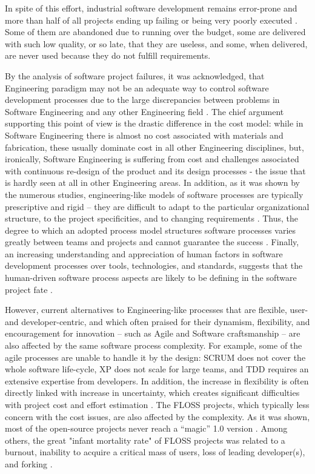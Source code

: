 In spite of this effort, industrial software development remains error-prone and more than half of all 
projects ending up failing or being very poorly executed \cite{chaos2006}.
Some of them are abandoned due to running over the budget, some are delivered with such low quality, 
or so late, that they are useless, and some, when delivered, are never used because they do not 
fulfill requirements. 

By the analysis of software project failures, it was acknowledged, that Engineering paradigm 
may not be an adequate way to control software development processes due to the large discrepancies 
between problems in Software Engineering and any other Engineering field 
\cite{citeulike:3729379} \cite{citeulike:5203446} \cite{citeulike:2207657}.
The chief argument supporting this point of view is the drastic difference in the cost model:
while in Software Engineering there is almost no cost associated with materials and fabrication, 
these usually dominate cost in all other Engineering disciplines, but, ironically, 
Software Engineering is suffering from cost and challenges associated with 
continuous re-design of the product and its design processes - the issue that is 
hardly seen at all in other Engineering areas. 
In addition, as it was shown by the numerous studies, engineering-like models of software processes 
are typically prescriptive and rigid -- they are difficult to adapt to the particular organizational 
structure, to the project specificities, and to changing requirements \cite{citeulike:113403}. 
Thus, the degree to which an adopted process model structures software processes varies greatly 
between teams and projects and cannot guarantee the success \cite{sacchi_2001}. 
Finally, an increasing understanding and appreciation of human factors in software development 
processes over tools, technologies, and standards, suggests that the human-driven software 
process aspects are likely to be defining in the software project fate \cite{citeulike:6580825} 
\cite{citeulike:149387} \cite{1605185} \cite{citeulike:113403} \cite{citeulike:12743107}. 

However, current alternatives to Engineering-like processes that are flexible, user- and developer-centric,
and which often praised for their dynamism, flexibility, and encouragement for innovation --
such as Agile and Software craftsmanship -- are also affected by the same software process complexity. 
For example, some of the agile processes are unable to handle it by the design: SCRUM does not cover 
the whole software life-cycle, XP does not scale for large teams, and TDD requires an extensive expertise 
from developers. In addition, the increase in flexibility is often directly linked with increase in uncertainty,
which creates significant difficulties with project cost and effort estimation 
\cite{citeulike:12933080} \cite{citeulike:9928907}.
The FLOSS projects, which typically less concern with the cost issues, are also affected by the complexity.
As it was shown, most of the open-source projects never reach a ``magic'' 1.0 version 
\cite{citeulike:12480029}. Among others, the great "infant mortality rate" of FLOSS projects was related 
to a burnout, inability to acquire a critical mass of users, loss of leading developer(s), 
and forking \cite{richter2007critique}. 

